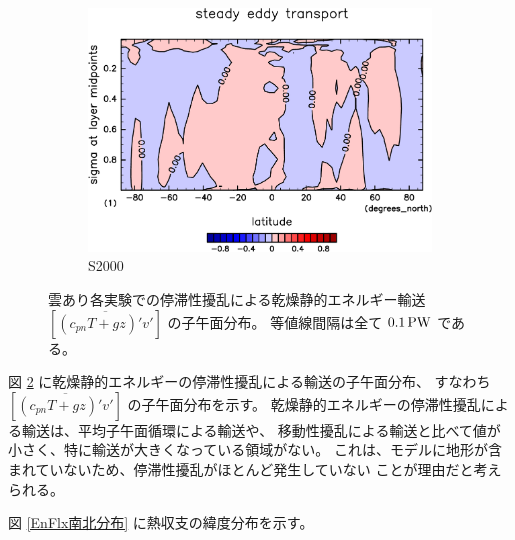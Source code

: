 \documentclass[body]{subfiles}
\begin{document}
\begin{figure}[t]
\begin{subfigure}{.4\textwidth}
		\includegraphics[width=\textwidth]{S2000/MeriHeatTransTest@dryStatEn_SE,time=7300:7665-crop-rotate.pdf}
		\caption{S2000}\label{乾燥静的エネルギー停滞性擾乱S2000}
	\end{subfigure}
	\caption[雲あり各実験でのに停滞性擾乱依る乾燥静的エネルギー輸送の子午面分布]{
		雲あり各実験での停滞性擾乱による乾燥静的エネルギー輸送 \([\overline{(c_{pn}T+gz)'v'}]\) の子午面分布。
		等値線間隔は全て \(0.1\hmu{PW}\) である。
	}\label{乾燥静的エネルギー停滞性擾乱}
\end{figure}

図 \ref{乾燥静的エネルギー停滞性擾乱} に乾燥静的エネルギーの停滞性擾乱による輸送の子午面分布、
すなわち \([\overline{(c_{pn}T+gz)'v'}]\) の子午面分布を示す。
乾燥静的エネルギーの停滞性擾乱による輸送は、平均子午面循環による輸送や、
移動性擾乱による輸送と比べて値が小さく、特に輸送が大きくなっている領域がない。
これは、モデルに地形が含まれていないため、停滞性擾乱がほとんど発生していない
ことが理由だと考えられる。

\afterpage{\clearpage}

図 \ref{EnFlx南北分布} に熱収支の緯度分布を示す。
\end{document}
